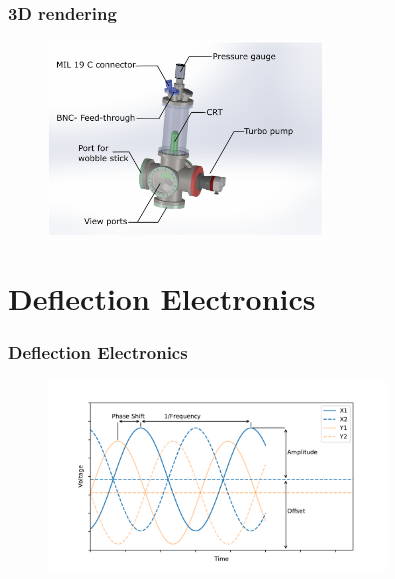 \documentclass[aspectratio=169]{beamer}
\begin{document}
\begin{frame}
	\frametitle{3D rendering}
	\begin{figure}[ht]
		\centering
		
		\includegraphics[width=0.65\textwidth]{../Chapters/vacuum-chamber/vacuum-chamber-annotated} %
	\end{figure}
\end{frame}

\section{Deflection Electronics}

\begin{frame}
	\frametitle{Deflection Electronics}
	\begin{figure}[ht]
		\centering
		\includegraphics[width=0.8\textwidth]{../Chapters/Deflection/VoltageAspects}
	\end{figure}
\end{frame}

\end{document}
